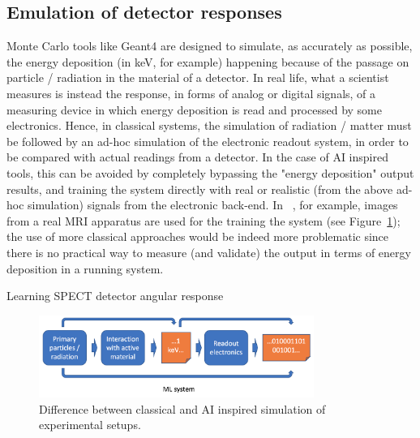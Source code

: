 \subsection{Emulation of detector responses}
Monte Carlo tools like Geant4 are designed to simulate, as accurately as possible, the energy deposition (in keV, for example) happening because of the passage on particle / radiation in the material of a detector. In real life, what a scientist measures is instead the response, in forms of analog or digital signals, of a measuring device in which energy deposition is read and processed by some electronics. Hence, in classical systems, the simulation of radiation / matter must be followed by an ad-hoc simulation of the electronic readout system, in order to be compared with actual readings from a detector. In the case of AI inspired tools, this can be avoided by completely bypassing the "energy deposition" output results, and training the system directly with real or realistic (from the above ad-hoc simulation) signals from the electronic back-end. In ~\cite{mri}, for example, images from a real MRI apparatus are used for the training the system (see Figure~\ref{fig:elec}); the use of more classical approaches would be indeed more problematic since there is no practical way to measure (and validate) the output in terms of energy deposition in a running system.

Learning SPECT detector angular response~\cite{Sarrut2018}

\begin{figure}[h]
    \centering

    \includegraphics[width=0.8\textwidth]{images/electronics.png}
    \caption{Difference between classical and AI inspired simulation of experimental setups.}
     \label{fig:elec}

\end{figure}

